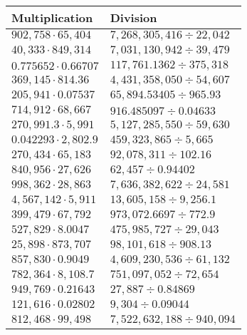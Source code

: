 \begin{longtable}[]{@{}ll@{}}
\toprule
Multiplication & Division\tabularnewline
\midrule
\endhead
\(902,758\cdot65,404\) & \(7,268,305,416÷22,042\)\tabularnewline
\(40,333\cdot849,314\) & \(7,031,130,942÷39,479\)\tabularnewline
\(0.775652\cdot0.66707\) & \(117,761.1362÷375,318\)\tabularnewline
\(369,145\cdot814.36\) & \(4,431,358,050÷54,607\)\tabularnewline
\(205,941\cdot0.07537\) & \(65,894.53405÷965.93\)\tabularnewline
\(714,912\cdot68,667\) & \(916.485097÷0.04633\)\tabularnewline
\(270,991.3\cdot5,991\) & \(5,127,285,550÷59,630\)\tabularnewline
\(0.042293\cdot2,802.9\) & \(459,323,865÷5,665\)\tabularnewline
\(270,434\cdot65,183\) & \(92,078,311÷102.16\)\tabularnewline
\(840,956\cdot27,626\) & \(62,457÷0.94402\)\tabularnewline
\(998,362\cdot28,863\) & \(7,636,382,622÷24,581\)\tabularnewline
\(4,567,142\cdot5,911\) & \(13,605,158÷9,256.1\)\tabularnewline
\(399,479\cdot67,792\) & \(973,072.6697÷772.9\)\tabularnewline
\(527,829\cdot8.0047\) & \(475,985,727÷29,043\)\tabularnewline
\(25,898\cdot873,707\) & \(98,101,618÷908.13\)\tabularnewline
\(857,830\cdot0.9049\) & \(4,609,230,536÷61,132\)\tabularnewline
\(782,364\cdot8,108.7\) & \(751,097,052÷72,654\)\tabularnewline
\(949,769\cdot0.21643\) & \(27,887÷0.84869\)\tabularnewline
\(121,616\cdot0.02802\) & \(9,304÷0.09044\)\tabularnewline
\(812,468\cdot99,498\) & \(7,522,632,188÷940,094\)\tabularnewline
\bottomrule
\end{longtable}
